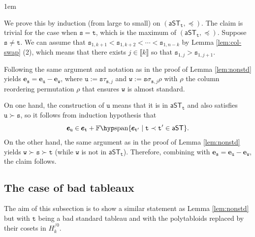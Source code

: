 \documentclass[a4paper]{amsart}
\makeatletter
\numberwithin{equation}{subsection}
\theoremstyle{definition}
\newcommand{\interval}[1]{\llbracket #1 \rrbracket}
\newcommand{\bfe}{\pmb{e}}
\newcommand{\tbx}{\mathtt{t}}
\newcommand{\aST}{\mathsf{aST}}
\newcommand{\tbs}{\mathtt{s}}
\newcommand{\Fspan}{\mathbb{F}\hyp\mathrm{span}}
\renewenvironment{proof}[1][\proofname]{\par
	\pushQED{\qed}%
	\normalfont \topsep0\p@\@plus6\p@ \labelsep1em\relax
	\trivlist
	\item[\hskip\labelsep\bfseries #1]\ignorespaces
	\mbox{}%
}{
	\popQED\endtrivlist\@endpefalse
}
\numberwithin{equation}{subsection}
\makeatother
\begin{document}
\begin{proof}
We prove this by induction (from large to small)  on $(\aST_\tbx, \preceq)$.
The claim is trivial for the case when $\tbs=\tbx$, which is the maximum of $(\aST_\tbx, \preceq)$.
Suppose $\tbs\neq \tbx$.
We can assume that $\tbs_{1,k+1} < \tbs_{1,k+2} < \cdots <\tbs_{1,n-k}$ by Lemma \ref{lem:col-swap} (2), which means that there exists $j\in\interval{k}$ so that $\tbs_{1,j}>\tbs_{1,j+1}$.

Following the same argument and notation as in the proof of Lemma \ref{lem:nonstd} yields $\bfe_{\tbs} = \bfe_{\mathtt{u}}-\bfe_{\mathtt{w}}$, where $\mathtt{u}:=\tbs\tau_{\tbs,j}$ and $\mathtt{w}:=\tbs\sigma_{\tbs,j}\rho$ with $\rho$ the column reordering permutation $\rho$ that ensures $\mathtt{w}$ is almost standard.

On one hand, the construction of $\mathtt{u}$ means that it is in $\aST_\tbx$ and also satisfies $\mathtt{u}\succ \tbs$, so it follows from induction hypothesis that
\[
\bfe_{\mathtt{u}} \in \bfe_{\tbx} + \Fspan\{\bfe_{\tbx'}\mid \tbx\prec\tbx'\in\aST\}.
\]
On the other hand, the same argument as in the proof of Lemma \ref{lem:nonstd} yields $\mathtt{w}\succ \tbs \succ \tbx$ (while $\mathtt{w}$ is not in $\aST_\tbx$).
Therefore, combining with $\bfe_{\tbs}=\bfe_{\mathtt{u}}-\bfe_{\mathtt{w}}$, the claim follows.
\end{proof}


\subsection{The case of bad tableaux}\label{subsec:badtab}
The aim of this subsection is to show a similar statement as Lemma \ref{lem:nonstd} but with $\tbx$ being a bad standard tableau and with the polytabloids replaced by their cosets in $H_k^{/0}$.
\end{document}
